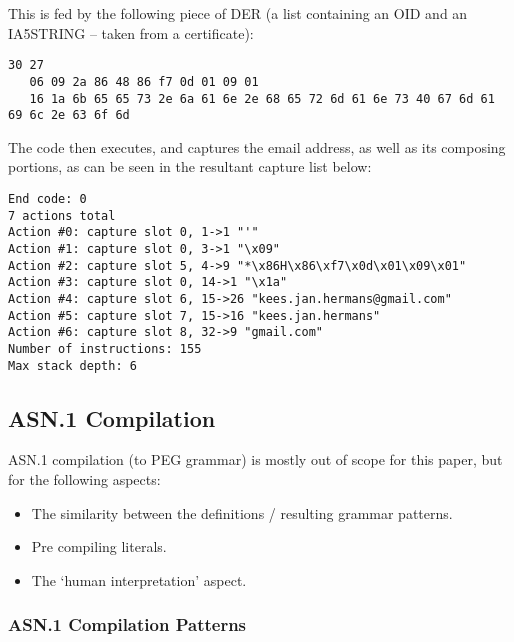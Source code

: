 This is fed by the following piece of DER (a list containing an OID and an 
IA5STRING – taken from a certificate):

\begin{changemargin}{-60mm}{0mm}
\begin{myquote}
\begin{verbatim}
30 27
   06 09 2a 86 48 86 f7 0d 01 09 01
   16 1a 6b 65 65 73 2e 6a 61 6e 2e 68 65 72 6d 61 6e 73 40 67 6d 61 69 6c 2e 63 6f 6d
\end{verbatim}
\end{myquote}
\end{changemargin}

The code then executes, and captures the email address, as well as its 
composing portions, as can be seen in the resultant capture list below:

\begin{changemargin}{-60mm}{0mm}
\begin{myquote}
\begin{verbatim}
End code: 0
7 actions total
Action #0: capture slot 0, 1->1 "'"
Action #1: capture slot 0, 3->1 "\x09"
Action #2: capture slot 5, 4->9 "*\x86H\x86\xf7\x0d\x01\x09\x01"
Action #3: capture slot 0, 14->1 "\x1a"
Action #4: capture slot 6, 15->26 "kees.jan.hermans@gmail.com"
Action #5: capture slot 7, 15->16 "kees.jan.hermans"
Action #6: capture slot 8, 32->9 "gmail.com"
Number of instructions: 155
Max stack depth: 6
\end{verbatim}
\end{myquote}
\end{changemargin}

\subsection{ASN.1 Compilation}

ASN.1 compilation (to PEG grammar) is mostly out of scope for this paper, 
but for the following aspects:
\begin{itemize}
    \item The similarity between the definitions / resulting grammar 
patterns.
    \item Pre compiling literals.
    \item The ‘human interpretation’ aspect.
\end{itemize}

\subsubsection{ASN.1 Compilation Patterns}

